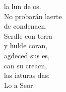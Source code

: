 \begin{cancion}
	la lun de os.\\
	No probarán laerte \\
	de condenacn.\\
	Serdle con terra \\
	y hulde coran,\\
	agdeced sus es, \\
	can su creacn,\\
	las iaturas das:\\
	Lo a Seor.\\
\end{cancion}%
